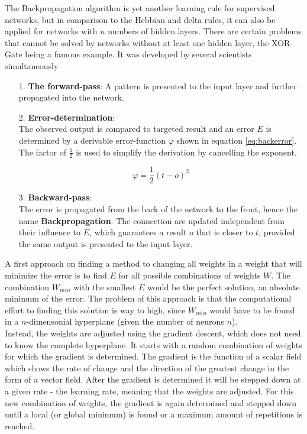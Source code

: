 \documentclass[10pt,a4paper,DIV=11]{scrreprt}
\begin{document}
The Backpropagation algorithm is yet another learning rule for supervised networks, but in comparison to the Hebbian and delta rules, it can also be applied for networks with $n$ numbers of hidden layers. There are certain problems that cannot be solved by networks without at least one hidden layer, the XOR-Gate being a famous example. 
It was developed by several scientists simultaneously %
\begin{itemize}
\item[1.] \textbf{The forward-pass}:
A pattern is presented to the input layer and further propagated into the network.
\item[2.] \textbf{Error-determination}:\\
The observed output is compared to targeted result and an error $E$ is determined by a derivable error-function $\varphi$ shown in equation \eqref{eq:backerror}. The factor of $\frac{1}{2}$ is used to simplify the derivation by cancelling the exponent.

\begin{equation}
\varphi = \frac{1}{2} (t-o)^2
\label{eq:backerror}
\end{equation}
\item[3.] \textbf{Backward-pass}:\\
The error is propagated from the back of the network to the front, hence the name \textbf{Backpropagation}. The connection are updated independent from their influence to $E$, which guarantees a result $o$ that is closer to $t$, provided the same output is presented to the input layer.
\end{itemize}

A first approach on finding a method to changing all weights in a weight that will minimize the error is to find $E$ for all possible combinations of weights $W$. The combination $W_{min}$ with the smallest $E$ would be the perfect solution, an absolute minimum of the error. The problem of this approach is that the computational effort to finding this solution is way to high, since $W_{min}$ would have to be found in a $n$-dimensonial  hyperplane (given the number of neurons $n$).\\

Instead, the weights are adjusted using the gradient descent, which does not need to know the complete hyperplane. It starts with a random combination of weights for which the gradient is determined. The gradient is the function of a scalar field which shows the rate of change and the direction of the greatest change in the form of a vector field. After the gradient is determined it will be stepped down at a given rate - the learning rate, meaning that the weights are adjusted. For this new combination of weights, the gradient is again determined and stepped down until a local (or global minimum) is found or a maximum amount of repetitions is reached.\\
\end{document}
